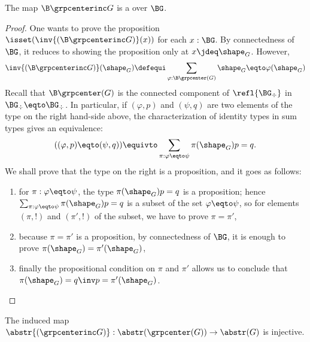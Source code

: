 \begin{lemma}
  \label{lemma:center-is-subgroup}%
  The map $\B \grpcenterinc G$ is a \covering over $\BG$.
\end{lemma}
\begin{proof}
  One wants to prove the proposition
  $\isset(\inv{(\B\grpcenterinc G)}(x))$ for each $x:\BG$. By
  connectedness of $\BG$, it reduces to showing the proposition only
  at $x\jdeq \shape_G$. However,
  \begin{displaymath}
    \inv{(\B\grpcenterinc G)}(\shape_G) \defequi \sum_{\varphi:{\B\grpcenter(G)}}{\shape_G \eqto \varphi(\shape_G)}
  \end{displaymath}
  Recall that $\B\grpcenter(G)$ is the connected component of
  $\refl{\BG_\div}$ in $\BG_\div \eqto \BG_\div$. In particular, if
  $(\varphi,p)$ and $(\psi,q)$ are two elements of the type on the
  right hand-side above, %
  the characterization of identity types in sum types gives an
  equivalence:
  \begin{displaymath}
    ((\varphi,p) \eqto (\psi,q)) \equivto \sum_{\pi:\varphi\eqto\psi}\pi(\shape_G) p = q.
  \end{displaymath}
  We shall prove that the type on the right is a proposition, and it goes as
  follows:
  \begin{enumerate}
  \item for $\pi:\varphi\eqto\psi$, the type $\pi(\shape_G) p = q$ is a
    proposition; hence $\sum_{\pi:\varphi\eqto\psi}\pi(\shape_G) p = q$ is a
    subset of the set $\varphi \eqto \psi$, so for elements $(\pi,!)$ and
    $(\pi',!)$ of the subset, we have to prove $\pi=\pi'$,
  \item because $\pi=\pi'$ is a proposition, by connectedness of $\BG$, it is
    enough to prove $\pi(\shape_G)=\pi'(\shape_G)$,
  \item finally the propositional condition on $\pi$ and $\pi'$ allows us to
    conclude that $\pi(\shape_G)= q\inv p = \pi'(\shape_G)$.
  \end{enumerate}
\end{proof}

\begin{corollary}
  \label{lemma:center-inc-inj-on-paths}%
  The induced map
  $\abstr {(\grpcenterinc G)}: \abstr(\grpcenter(G)) \to \abstr(G)$ is
  injective.
\end{corollary}

